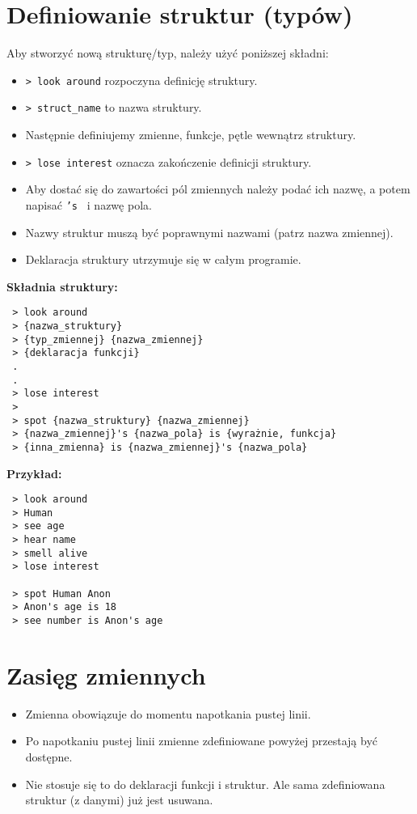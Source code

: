 \documentclass{article}
\begin{document}
\newpage

\section{Definiowanie struktur (typów)}

Aby stworzyć nową strukturę/typ, należy użyć poniższej składni:

\begin{itemize}
    \item \texttt{> look around} rozpoczyna definicję struktury.
    \item \texttt{> struct\_name} to nazwa struktury.
    \item Następnie definiujemy zmienne, funkcje, pętle wewnątrz struktury.
    \item \texttt{> lose interest} oznacza zakończenie definicji struktury.
    \item Aby dostać się do zawartości pól zmiennych należy podać ich nazwę, a potem napisać \texttt{'s } i nazwę pola.
    \item Nazwy struktur muszą być poprawnymi nazwami (patrz nazwa zmiennej).
    \item Deklaracja struktury utrzymuje się w całym programie.

\end{itemize}
\textbf{Składnia struktury:}
{ \color{green}
\begin{verbatim}
 > look around
 > {nazwa_struktury}
 > {typ_zmiennej} {nazwa_zmiennej}
 > {deklaracja funkcji}
 .
 .
 > lose interest
 >
 > spot {nazwa_struktury} {nazwa_zmiennej}
 > {nazwa_zmiennej}'s {nazwa_pola} is {wyrażnie, funkcja}
 > {inna_zmienna} is {nazwa_zmiennej}'s {nazwa_pola}
\end{verbatim}
}
\textbf{Przykład:}
{ \color{green}
\begin{verbatim}
 > look around
 > Human
 > see age
 > hear name
 > smell alive
 > lose interest

 > spot Human Anon
 > Anon's age is 18
 > see number is Anon's age
\end{verbatim}
}

\section{Zasięg zmiennych}

\begin{itemize}
    \item Zmienna obowiązuje do momentu napotkania pustej linii.
    \item Po napotkaniu pustej linii zmienne zdefiniowane powyżej przestają być dostępne.
    \item Nie stosuje się to do deklaracji funkcji i struktur. Ale sama zdefiniowana struktur (z danymi) już jest usuwana.
\end{itemize}
\end{document}
